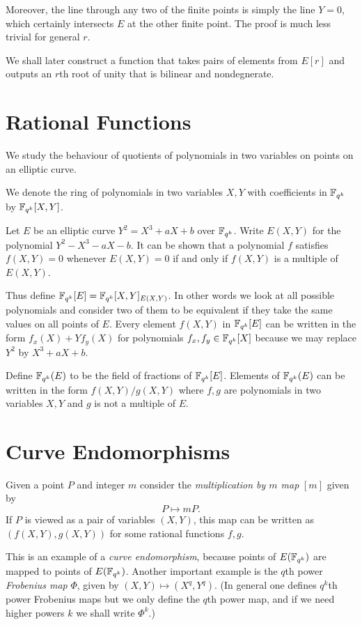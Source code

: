 Moreover,
the line through any two of the finite points is simply the line $Y = 0$,
which certainly intersects $E$ at the other finite point.
The proof is much less trivial for general $r$.

We shall later construct a function
that takes pairs of elements from $E[r]$ and outputs an $r$th root of unity
that is bilinear and nondegnerate.

\section {Rational Functions}

We study the behaviour of quotients of polynomials in two variables on
points on an elliptic curve.

We denote the ring of polynomials in two variables $X,Y$
with coefficients in $\mathbb{F}_{q^k}$ by $\mathbb{F}_{q^k}[X,Y]$. 

Let $E$ be an elliptic curve $Y^2 = X^3 + aX + b$ over $\mathbb{F}_{q^k}$.
Write $E(X,Y)$ for the polynomial $Y^2 - X^3 - aX - b$.
It can be shown that a polynomial $f$ satisfies $f(X,Y) = 0$
whenever $E(X,Y) = 0$ if and only if $f(X,Y)$ is a multiple of $E(X,Y)$.

Thus define $\mathbb{F}_{q^k}[E] = \mathbb{F}_{q^k}[X,Y]_{E(X,Y)}$. In other words we look at all
possible polynomials and consider two of them to be
equivalent if they take the same values on all points of $E$.
Every element $f(X,Y)$ in $\mathbb{F}_{q^k}[E]$ can be written in the form
$f_x(X) + Y f_y(X)$ for polynomials $f_x, f_y \in \mathbb{F}_{q^k}[X]$ because
we may replace $Y^2$ by $X^3 + aX + b$.

Define $\mathbb{F}_{q^k}(E)$ to be the field of fractions of $\mathbb{F}_{q^k}[E]$.
Elements of $\mathbb{F}_{q^k}(E)$ can be written in the form
$f(X,Y) / g(X,Y)$ where $f, g$ are polynomials in two variables $X, Y$
and $g$ is not a multiple of $E$.

\section {Curve Endomorphisms}

Given a point $P$ and integer $m$ consider the \emph{multiplication by $m$ map}
$[m]$ given by \[ P \mapsto m P . \]
If $P$ is viewed as a pair of variables $(X,Y)$, this map
can be written as $(f(X,Y), g(X,Y))$ for some rational functions $f,g$.

This is an example of a \emph{curve endomorphism}, because points of
$E(\mathbb{F}_{q^k})$ are mapped to points of $E(\mathbb{F}_{q^k})$. Another important example
is the $q$th power \emph{Frobenius map} $\Phi$,
given by $(X, Y) \mapsto (X^{q}, Y^{q})$. (In general one defines
$q^k$th power Frobenius maps but we only define the $q$th power map,
and if we need higher powers $k$ we shall write $\Phi^k$.)


